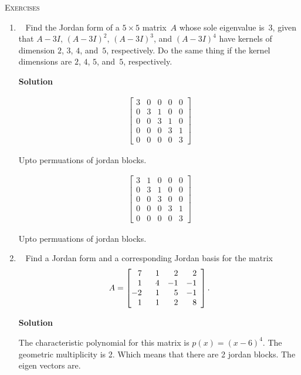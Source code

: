 \documentclass[11pt]{article}
\newcommand\score[1]{\marginpar{\vspace{-2ex}\color{blue}{#1/3}}\hspace{-1ex}}
\newcommand\0{\mathbf{0}}
\newcommand\<{\langle}
\renewcommand\>{\rangle}
\begin{document}
\noindent
\textsc{Exercises}%

\begin{enumerate}
\item\ \score{}%
Find the Jordan form of a $5 \times 5$ matrix~$A$ whose sole
eigenvalue is~$3$, given that $A - 3I$, $(A - 3I)^2$, $(A - 3I)^3$,
and $(A - 3I)^4$ have kernels of dimension $2$, $3$, $4$, and~$5$,
respectively.  Do the same thing if the kernel dimensions are $2$,
$4$, $5$, and~$5$, respectively.

\textbf{Solution}

\begin{align}
  \begin{bmatrix}
    3 & 0 & 0 & 0 & 0\\
    0 & 3 & 1 & 0 & 0\\
    0 & 0 & 3 & 1 & 0\\
    0 & 0 & 0 & 3 & 1\\
    0 & 0 & 0 & 0 & 3
  \end{bmatrix}
\end{align}

Upto permuations of jordan blocks.

\begin{align}
  \begin{bmatrix}
    3 & 1 & 0 & 0 & 0\\
    0 & 3 & 1 & 0 & 0\\
    0 & 0 & 3 & 0 & 0\\
    0 & 0 & 0 & 3 & 1\\
    0 & 0 & 0 & 0 & 3
  \end{bmatrix}
\end{align}

Upto permuations of jordan blocks.

\pagebreak



\item\ \score{}%
Find a Jordan form and a corresponding Jordan basis for the matrix
$$%
A =
\left[
\begin{array}{@{}rrrr}
   7\ &\ 1 &  2 &  2 \\
   1\ &\ 4 & -1 & -1 \\
  -2\ &\ 1 &  5 & -1 \\
   1\ &\ 1 &  2 &  8 
\end{array}
\right].
$$%

\textbf{Solution}

The characteristic polynomial for this matrix is $p(x)=(x-6)^4$. The geometric multiplicity is 2.
Which means that there are 2 jordan blocks. The eigen vectors are.


\end{enumerate}
\end{document}
